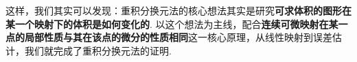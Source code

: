 这样，我们其实可以发现：重积分换元法的核心想法其实是研究\textbf{可求体积的图形在某一个映射下的体积是如何变化的}. 以这个想法为主线，配合\textbf{连续可微映射在某一点的局部性质与其在该点的微分的性质相同}这一核心原理，从线性映射到误差估计，我们就完成了重积分换元法的证明.

\begin{summary}

\end{summary}

\begin{exercise}

    \begin{exgroup}
        \item %
    \end{exgroup}

    \begin{exgroup}
        \item
    \end{exgroup}

    \begin{exgroup}
        \item
    \end{exgroup}
\end{exercise}
